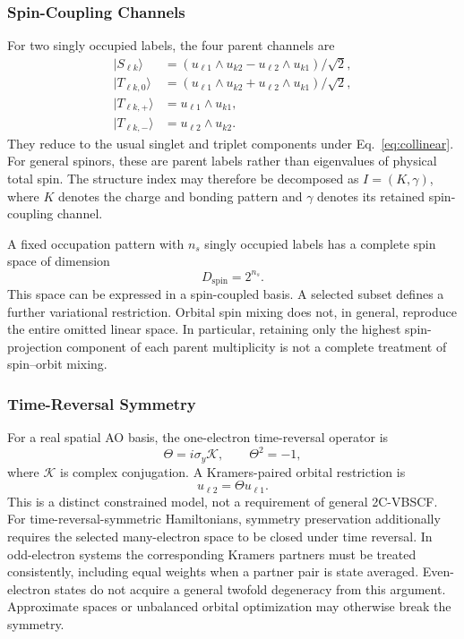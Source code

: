 \documentclass[12pt]{article}
\begin{document}
\subsubsection{Spin-Coupling Channels}

For two singly occupied labels, the four parent channels are
\begin{equation}
 \begin{aligned}
 |S_{\ell k}\rangle&=
 (u_{\ell1}\wedge u_{k2}-u_{\ell2}\wedge u_{k1})/\sqrt2,\\
 |T_{\ell k,0}\rangle&=
 (u_{\ell1}\wedge u_{k2}+u_{\ell2}\wedge u_{k1})/\sqrt2,\\
 |T_{\ell k,+}\rangle&=u_{\ell1}\wedge u_{k1},\\
 |T_{\ell k,-}\rangle&=u_{\ell2}\wedge u_{k2}.
 \end{aligned}
 \label{eq:pairchannels}
\end{equation}
They reduce to the usual singlet and triplet components under Eq.~\eqref{eq:collinear}. For general spinors, these are parent labels rather than eigenvalues of physical total spin. The structure index may therefore be decomposed as \(I=(K,\gamma)\), where \(K\) denotes the charge and bonding pattern and \(\gamma\) denotes its retained spin-coupling channel.

A fixed occupation pattern with \(n_s\) singly occupied labels has a complete spin space of dimension
\begin{equation}
 D_{\mathrm{spin}}=2^{n_s}.
 \label{eq:spinspace}
\end{equation}
This space can be expressed in a spin-coupled basis. A selected subset defines a further variational restriction. Orbital spin mixing does not, in general, reproduce the entire omitted linear space. In particular, retaining only the highest spin-projection component of each parent multiplicity is not a complete treatment of spin--orbit mixing.

\subsubsection{Time-Reversal Symmetry}

For a real spatial AO basis, the one-electron time-reversal operator is
\begin{equation}
 \Theta=i\sigma_y\mathcal K,
 \qquad \Theta^2=-1,
 \label{eq:timereversal}
\end{equation}
where \(\mathcal K\) is complex conjugation. A Kramers-paired orbital restriction is
\begin{equation}
 u_{\ell2}=\Theta u_{\ell1}.
 \label{eq:kramerspair}
\end{equation}
This is a distinct constrained model, not a requirement of general 2C-VBSCF. For time-reversal-symmetric Hamiltonians, symmetry preservation additionally requires the selected many-electron space to be closed under time reversal. In odd-electron systems the corresponding Kramers partners must be treated consistently, including equal weights when a partner pair is state averaged. Even-electron states do not acquire a general twofold degeneracy from this argument. Approximate spaces or unbalanced orbital optimization may otherwise break the symmetry.\cite{kasper2020}
\end{document}
